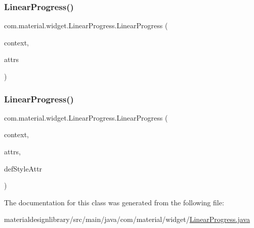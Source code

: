 \mbox{\label{classcom_1_1material_1_1widget_1_1_linear_progress_a768fa049552daed30aa829fb62f60099}} 
\subsubsection{\texorpdfstring{Linear\+Progress()}{LinearProgress()}\hspace{0.1cm}{\footnotesize\ttfamily [2/3]}}
{\footnotesize\ttfamily com.\+material.\+widget.\+Linear\+Progress.\+Linear\+Progress (\begin{DoxyParamCaption}\item[{Context}]{context,  }\item[{Attribute\+Set}]{attrs }\end{DoxyParamCaption})}

\mbox{\label{classcom_1_1material_1_1widget_1_1_linear_progress_a8f6e73d2d4c8aab93c431d67d290ba50}} 
\subsubsection{\texorpdfstring{Linear\+Progress()}{LinearProgress()}\hspace{0.1cm}{\footnotesize\ttfamily [3/3]}}
{\footnotesize\ttfamily com.\+material.\+widget.\+Linear\+Progress.\+Linear\+Progress (\begin{DoxyParamCaption}\item[{Context}]{context,  }\item[{Attribute\+Set}]{attrs,  }\item[{int}]{def\+Style\+Attr }\end{DoxyParamCaption})}



The documentation for this class was generated from the following file\+:\begin{DoxyCompactItemize}
\item 
materialdesignlibrary/src/main/java/com/material/widget/\hyperlink{_linear_progress_8java}{Linear\+Progress.\+java}\end{DoxyCompactItemize}
